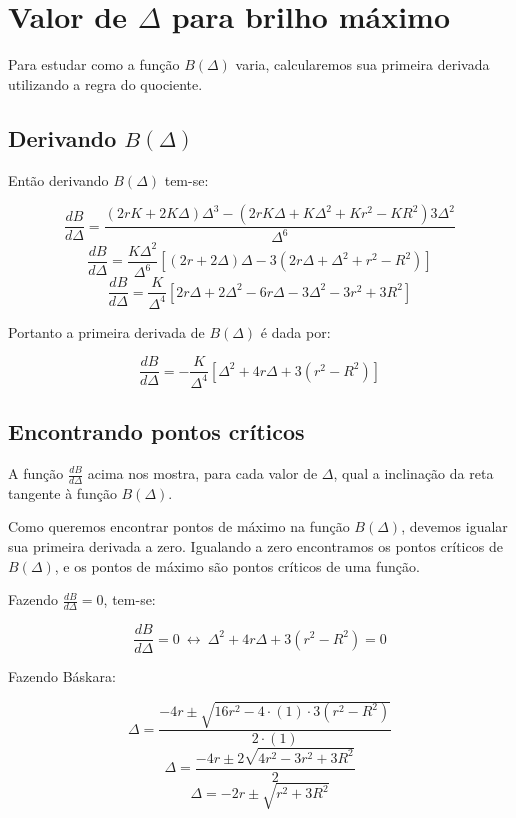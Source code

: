 \documentclass[a4paper, 12pt]{article}
\begin{document}
\section{Valor de $\Delta$ para brilho máximo}

Para estudar como a função $B\left(\Delta \right)$ varia, calcularemos sua primeira derivada utilizando a regra do quociente.

\subsection{Derivando $B\left(\Delta \right)$}

Então derivando $B\left(\Delta \right)$ tem-se:

$$\frac{dB}{d\Delta }=\frac{\left(2rK+2K\Delta \right)\Delta ^3-\left(2rK\Delta +K\Delta ^2+Kr^2-KR^2\right)3\Delta ^2}{\Delta ^6}$$
$$\frac{dB}{d\Delta }=\frac{K\Delta ^2}{\Delta ^6}\left[\left(2r+2\Delta \right)\Delta -3\left(2r\Delta +\Delta ^2+r^2-R^2\right)\right]$$
$$\frac{dB}{d\Delta }=\frac{K}{\Delta ^4}\left[2r\Delta +2\Delta ^2-6r\Delta -3\Delta ^2-3r^2+3R^2\right]$$

Portanto a primeira derivada de $B\left(\Delta \right)$ é dada por:

\begin{equation}\label{derivada_brilho_em_delta}
    \boxed{\ \frac{dB}{d\Delta }=-\frac{K}{\Delta ^4}\left[\Delta ^2+4r\Delta +3\left(r^2-R^2\right)\right]\ }
\end{equation}

\subsection{Encontrando pontos críticos}

A função $\frac{dB}{d\Delta }$ acima nos mostra, para cada valor de $\Delta$, qual a inclinação da reta tangente à função $B\left(\Delta \right)$.

Como queremos encontrar pontos de máximo na função $B\left(\Delta \right)$, devemos igualar sua primeira derivada a zero. Igualando a zero encontramos os pontos críticos de $B\left(\Delta \right)$, e os pontos de máximo são pontos críticos de uma função.

Fazendo $\frac{dB}{d\Delta }=0$, tem-se:

$$\frac{dB}{d\Delta }=0\ \longleftrightarrow \ \Delta ^2+4r\Delta +3\left(r^2-R^2\right)=0$$

Fazendo Báskara:

$$\Delta =\frac{-4r\pm \sqrt{16r^2-4\cdot \left(1\right)\cdot 3\left(r^2-R^2\right)}}{2\cdot \left(1\right)}$$
$$\Delta =\frac{-4r\pm 2\sqrt{4r^2-3r^2+3R^2}}{2}$$
$$\Delta =-2r\pm \sqrt{r^2+3R^2}$$
\end{document}
